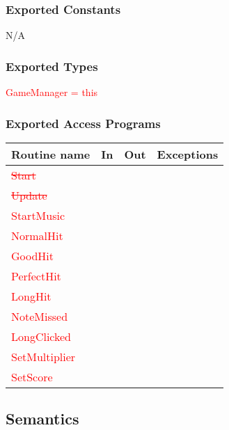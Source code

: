\documentclass[12pt]{article}
\begin{document}
\subsubsection{Exported Constants}
N/A

\subsubsection{Exported Types}
\textcolor{red}{GameManager = this}

\subsubsection{Exported Access Programs}
\begin{tabular}{| l | l | l | l |}
\hline
\textbf{Routine name} & \textbf{In} & \textbf{Out} & \textbf{Exceptions}\\
\hline
\textcolor{red}{\sout{Start}}   &      &           &          \\
\hline
\textcolor{red}{\sout{Update}}   &     &           &          \\
\hline
\textcolor{red}{StartMusic}   &     &           &          \\
\hline
\textcolor{red}{NormalHit}   &     &           &          \\
\hline
\textcolor{red}{GoodHit}   &     &           &          \\
\hline
\textcolor{red}{PerfectHit}   &     &           &          \\
\hline
\textcolor{red}{LongHit}   &     &           &          \\
\hline
\textcolor{red}{NoteMissed}   &     &           &          \\
\hline
\textcolor{red}{LongClicked}   &     &           &          \\
\hline
\textcolor{red}{SetMultiplier}   &     &           &          \\
\hline
\textcolor{red}{SetScore}   &     &           &          \\
\hline
\end{tabular}

\subsection{Semantics}
\end{document}

